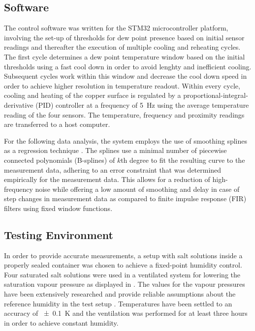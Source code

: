 \documentclass[conference,a4paper]{IEEEtran}
\begin{document}
\subsection{Software}
The control software was written for the STM32 microcontroller platform, involving the set-up of thresholds for dew point presence based on initial sensor readings and thereafter the execution of multiple cooling and reheating cycles. The first cycle determines a dew point temperature window based on the initial thresholds using a fast cool down in order to avoid lenghty and inefficient cooling. Subsequent cycles work within this window and decrease the cool down speed in order to achieve higher resolution in temperature readout. Within every cycle, cooling and heating of the copper surface is regulated by a proportional-integral-derivative (PID) controller at a frequency of \qty{5}{\Hz} using the average temperature reading of the four sensors. The temperature, frequency and proximity readings are transferred to a host computer.

For the following data analysis, the system employs the use of smoothing splines as a regression technique \autocite{ScipyInterpolateSplrep,dierckxAlgorithmSmoothingDifferentiation1975}. The splines use a minimal number of piecewise connected polynomials (B-splines) of $k$th degree to fit the resulting curve to the measurement data, adhering to an error constraint that was determined empirically for the measurement data. This allows for a reduction of high-frequency noise while offering a low amount of smoothing and delay in case of step changes in measurement data as compared to finite impulse response (FIR) filters using fixed window functions.

\subsection{Testing Environment}
In order to provide accurate measurements, a setup with salt solutions inside a properly sealed container was chosen to achieve a fixed-point humidity control. Four saturated salt solutions were used in a ventilated system for lowering the saturation vapour pressure as displayed in . The values for the vapour pressures have been extensively researched and provide reliable assumptions about the reference humidity in the test setup \autocite{greenspanHumidityFixedPoints1977}. Temperatures have been settled to an accuracy of \qty{\pm 0.1}{\K} and the ventilation was performed for at least three hours in order to achieve constant humidity.
\end{document}
